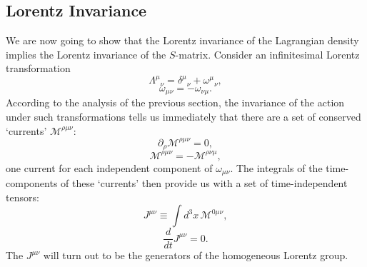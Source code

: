 
\subsection{Lorentz Invariance}

We are now going to show that the Lorentz invariance of the Lagrangian density
implies the Lorentz invariance of the $S$-matrix. Consider an infinitesimal
Lorentz transformation
\begin{equation}
\Lambda^\mu{}_\nu=\delta^\mu{}_\nu+\omega^\mu{}_\nu,
\tag{7.4.1}\label{eq:7.4.1}
\end{equation}
\begin{equation}
\omega_{\mu\nu}=-\omega_{\nu\mu}.
\tag{7.4.2}\label{eq:7.4.2}
\end{equation}
According to the analysis of the previous section, the invariance of the
action under such transformations tells us immediately that there are a set of
conserved `currents' $\mathcal{M}^{\rho\mu\nu}$:
\begin{equation}
\partial_\rho\mathcal{M}^{\rho\mu\nu}=0,
\tag{7.4.3}\label{eq:7.4.3}
\end{equation}
\begin{equation}
\mathcal{M}^{\rho\mu\nu}=-\mathcal{M}^{\rho\nu\mu},
\tag{7.4.4}\label{eq:7.4.4}
\end{equation}
one current for each independent component of $\omega_{\mu\nu}$. The integrals
of the time-components of these `currents' then provide us with a set of
time-independent tensors:
\begin{equation}
J^{\mu\nu}\equiv\int d^3x\,\mathcal{M}^{0\mu\nu},
\tag{7.4.5}\label{eq:7.4.5}
\end{equation}
\begin{equation}
\frac{d}{dt}J^{\mu\nu}=0.
\tag{7.4.6}\label{eq:7.4.6}
\end{equation}
The $J^{\mu\nu}$ will turn out to be the generators of the homogeneous Lorentz
group.

